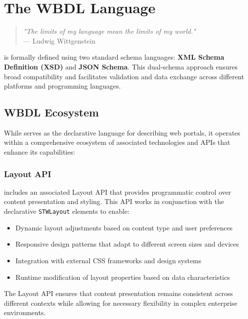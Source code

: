 
\chapter{The WBDL Language}
\label{chap:wbdl}

\begin{quote}
\textit{"The limits of my language mean the limits of my world."} \\
— Ludwig Wittgenstein
\end{quote}

\wbdl{} is formally defined using two standard schema languages: \textbf{XML Schema Definition (XSD)} and \textbf{JSON Schema}. This dual-schema approach ensures broad compatibility and facilitates validation and data exchange across different platforms and programming languages.

\section{WBDL Ecosystem}
\label{sec:wbdl-ecosystem}

While \wbdl{} serves as the declarative language for describing web portals, it operates within a comprehensive ecosystem of associated technologies and APIs that enhance its capabilities:

\subsection{Layout API}
\label{sec:layout-api}

\wbdl{} includes an associated Layout API that provides programmatic control over content presentation and styling. This API works in conjunction with the declarative \texttt{STWLayout} elements to enable:

\begin{itemize}
\item Dynamic layout adjustments based on content type and user preferences
\item Responsive design patterns that adapt to different screen sizes and devices
\item Integration with external CSS frameworks and design systems
\item Runtime modification of layout properties based on data characteristics
\end{itemize}

The Layout API ensures that content presentation remains consistent across different contexts while allowing for necessary flexibility in complex enterprise environments.

